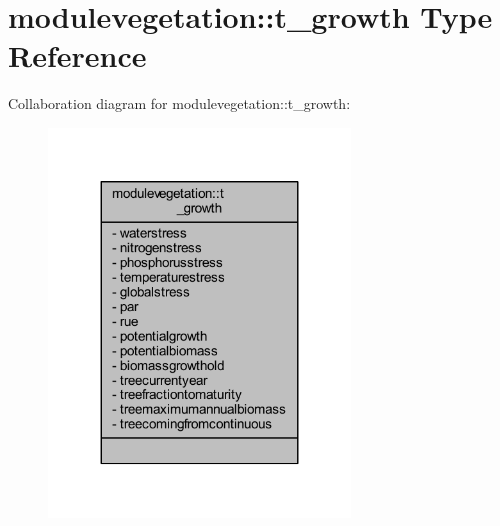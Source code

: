 \hypertarget{structmodulevegetation_1_1t__growth}{}\section{modulevegetation\+:\+:t\+\_\+growth Type Reference}
\label{structmodulevegetation_1_1t__growth}


Collaboration diagram for modulevegetation\+:\+:t\+\_\+growth\+:\nopagebreak
\begin{figure}[H]
\begin{center}
\leavevmode
\includegraphics[width=227pt]{structmodulevegetation_1_1t__growth__coll__graph}
\end{center}
\end{figure}
